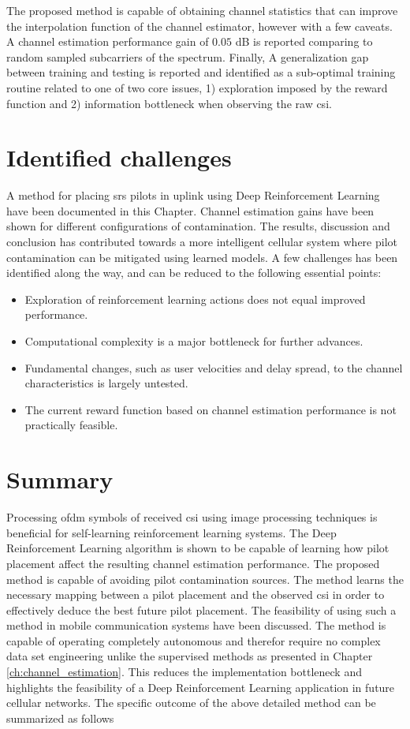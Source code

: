 The proposed method is capable of obtaining channel statistics that can improve the interpolation function of the channel estimator, however with a few caveats. A channel estimation performance gain of $0.05$ dB is reported comparing to random sampled subcarriers of the spectrum. Finally, A generalization gap between training and testing is reported and identified as a sub-optimal training routine related to one of two core issues, 1) exploration imposed by the reward function and 2) information bottleneck when observing the raw \gls{csi}.

\section{Identified challenges}\label{sec:RL_challenges}
A method for placing \gls{srs} pilots in uplink using Deep Reinforcement Learning have been documented in this Chapter. Channel estimation gains have been shown for different configurations of contamination. The results, discussion and conclusion has contributed towards a more intelligent cellular system where pilot contamination can be mitigated using learned models. A few challenges has been identified along the way, and can be reduced to the following essential points:

\begin{itemize}
    \item Exploration of reinforcement learning actions does not equal improved performance.
    \item Computational complexity is a major bottleneck for further advances.
    \item Fundamental changes, such as user velocities and delay spread, to the channel characteristics is largely untested.
    \item The current reward function based on channel estimation performance is not practically feasible.
\end{itemize}


\section{Summary}\label{sec:RL_summary}
Processing \gls{ofdm} symbols of received \gls{csi} using image processing techniques is beneficial for self-learning reinforcement learning systems. The Deep Reinforcement Learning algorithm is shown to be capable of learning how pilot placement affect the resulting channel estimation performance. The proposed method is capable of avoiding pilot contamination sources. The method learns the necessary mapping between a pilot placement and the observed \gls{csi} in order to effectively deduce the best future pilot placement. The feasibility of using such a method in mobile communication systems have been discussed. The method is capable of operating completely autonomous and therefor require no complex data set engineering unlike the supervised methods as presented in Chapter \ref{ch:channel_estimation}. This reduces the implementation bottleneck and highlights the feasibility of a Deep Reinforcement Learning application in future cellular networks. The specific outcome of the above detailed method can be summarized as follows

